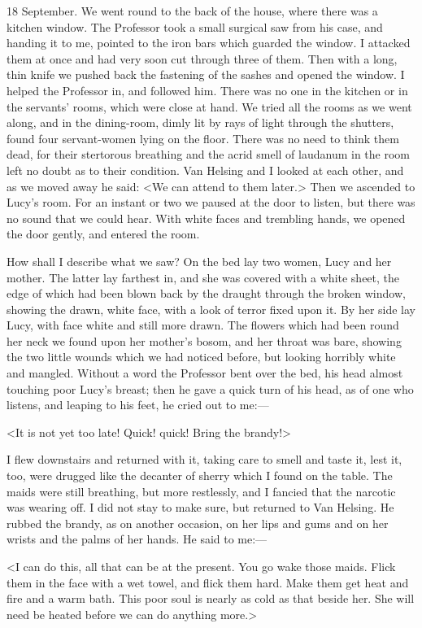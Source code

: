 \begin{diary}{18 September.}
We went round to the back of the house, where there was a kitchen window. The Professor took a small surgical saw from his case, and handing it to me, pointed to the iron bars which guarded the window. I attacked them at once and had very soon cut through three of them. Then with a long, thin knife we pushed back the fastening of the sashes and opened the window. I helped the Professor in, and followed him. There was no one in the kitchen or in the servants' rooms, which were close at hand. We tried all the rooms as we went along, and in the dining-room, dimly lit by rays of light through the shutters, found four servant-women lying on the floor. There was no need to think them dead, for their stertorous breathing and the acrid smell of laudanum in the room left no doubt as to their condition. Van Helsing and I looked at each other, and as we moved away he said: <We can attend to them later.> Then we ascended to Lucy's room. For an instant or two we paused at the door to listen, but there was no sound that we could hear. With white faces and trembling hands, we opened the door gently, and entered the room.

How shall I describe what we saw? On the bed lay two women, Lucy and her mother. The latter lay farthest in, and she was covered with a white sheet, the edge of which had been blown back by the draught through the broken window, showing the drawn, white face, with a look of terror fixed upon it. By her side lay Lucy, with face white and still more drawn. The flowers which had been round her neck we found upon her mother's bosom, and her throat was bare, showing the two little wounds which we had noticed before, but looking horribly white and mangled. Without a word the Professor bent over the bed, his head almost touching poor Lucy's breast; then he gave a quick turn of his head, as of one who listens, and leaping to his feet, he cried out to me:—

<It is not yet too late! Quick! quick! Bring the brandy!>

I flew downstairs and returned with it, taking care to smell and taste it, lest it, too, were drugged like the decanter of sherry which I found on the table. The maids were still breathing, but more restlessly, and I fancied that the narcotic was wearing off. I did not stay to make sure, but returned to Van Helsing. He rubbed the brandy, as on another occasion, on her lips and gums and on her wrists and the palms of her hands. He said to me:—

<I can do this, all that can be at the present. You go wake those maids. Flick them in the face with a wet towel, and flick them hard. Make them get heat and fire and a warm bath. This poor soul is nearly as cold as that beside her. She will need be heated before we can do anything more.>


\end{diary}
